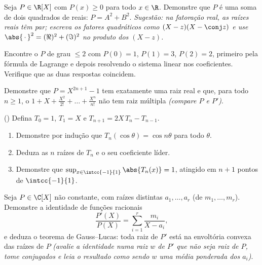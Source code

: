 \begin{exercise}[$\star\star$]\label{exo:b1:poly:7}
Seja $P \in \R[X]$ com $P(x) \geq 0$ para todo $x \in \R$. Demonstre que
$P$ é uma soma de dois quadrados de  reais: $P = A^2 + B^2$.
\emph{Sugestão: na fatoração real, as raízes reais têm 
par; escreva os fatores quadráticos como $(X - z)(X - \conj z)$
e use $\abs{\,\cdot\,}^2 = (\Re)^2 + (\Im)^2$ no produto dos
$(X - z)$.}
\end{exercise}

\begin{exercise}[$\star\star$]\label{exo:b1:poly:8}
Encontre o  $P$ de grau $\leq 2$ com $P(0) = 1$, $P(1) =
3$, $P(2) = 2$, primeiro pela fórmula de Lagrange e depois resolvendo o
sistema linear nos coeficientes. Verifique que as duas respostas
coincidem.
\end{exercise}

\begin{exercise}[$\star\star$]\label{exo:b1:poly:9}
Demonstre que $P = X^{2n+1} - 1$ tem exatamente uma raiz real e que, para
todo $n \geq 1$, o  $1 + X + \frac{X^2}{2!} + \dots +
\frac{X^n}{n!}$ não tem raiz múltipla \emph{(compare $P$ e
$P'$)}.
\end{exercise}

\begin{exercise}[$\star\star\star$]\label{exo:b1:poly:10}
() Defina $T_0 = 1$, $T_1 = X$ e $T_{n+1} =
2X\,T_n - T_{n-1}$.
\begin{enumerate}
  \item Demonstre por indução que $T_n(\cos\theta) = \cos n\theta$ para
        todo $\theta$.
  \item Deduza as $n$ raízes de $T_n$ e o seu coeficiente líder.
  \item Demonstre que $\sup_{x \in \intcc{-1}{1}} \abs{T_n(x)} = 1$,
        atingido em $n + 1$ pontos de $\intcc{-1}{1}$.
\end{enumerate}
\end{exercise}

\begin{exercise}[$\star\star\star$]\label{exo:b1:poly:11}
Seja $P \in \C[X]$ não constante, com raízes distintas $a_1, \dots,
a_r$ (de  $m_1, \dots, m_r$). Demonstre a identidade
de funções racionais
\[
\frac{P'(X)}{P(X)} = \sum_{i=1}^{r} \frac{m_i}{X - a_i},
\]
e deduza o teorema de Gauss--Lucas: toda raiz de $P'$ está na
envoltória convexa das raízes de $P$ \emph{(avalie a identidade numa
raiz $w$ de $P'$ que não seja raiz de $P$, tome conjugados e
leia o resultado como sendo $w$ uma média ponderada dos $a_i$)}.
\end{exercise}

